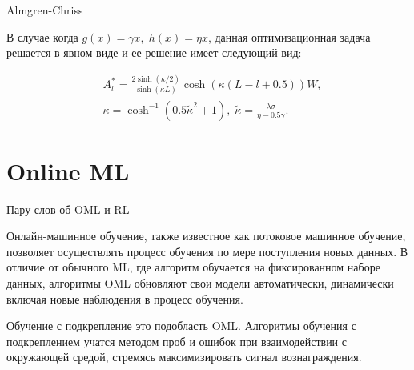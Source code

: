 \documentclass[aspectratio=169]{beamer}
\begin{document}
    \begin{frame}{Almgren-Chriss}

        В случае когда $g(x) = \gamma x, \; h(x) = \eta x $, данная оптимизационная задача решается в явном виде и ее решение имеет следующий вид:

        \begin{align} 
            &A_l^{*} = \frac{2 \sinh(\kappa/2)}{\sinh(\kappa L)}\cosh(\kappa (L - l + 0.5) )W, \label{Al}\\
            &\kappa = \cosh^{-1}(0.5\tilde \kappa^2 + 1), \; \tilde \kappa = \frac{\lambda \sigma}{\eta - 0.5 \gamma}. \label{kappa}
        \end{align}

    \end{frame}


    \section{Online ML}

    \begin{frame}{Пару слов об OML и RL}

        Онлайн-машинное обучение, также известное как потоковое машинное обучение, позволяет осуществлять процесс обучения по мере поступления новых данных. В отличие от обычного ML, где алгоритм обучается на фиксированном наборе данных, алгоритмы OML обновляют свои модели автоматически, динамически включая новые наблюдения в процесс обучения. 
    
        Обучение с подкрепление это подобласть OML. Алгоритмы обучения с подкреплением учатся методом проб и ошибок при взаимодействии с окружающей средой, стремясь максимизировать сигнал вознаграждения.

    \end{frame}
\end{document}
